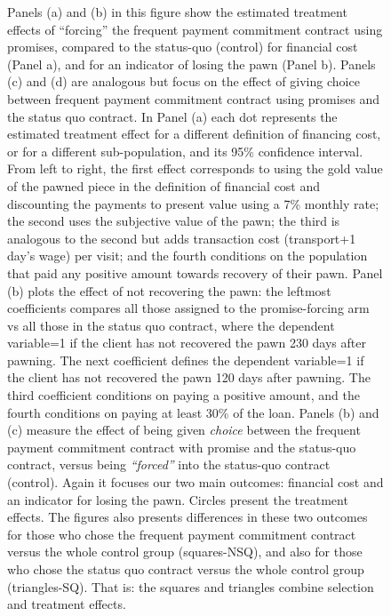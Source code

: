 \documentclass[11pt]{article}
\begin{document}
\begin{figure}[H]
\begin{center}
    \end{center}
    \scriptsize
    Panels (a) and (b) in this figure show the estimated treatment effects of ``forcing'' the frequent payment commitment contract using promises, compared to the status-quo (control) for financial cost (Panel a), and for an indicator of losing the pawn (Panel b). Panels (c) and (d) are analogous but focus on the effect of giving choice between frequent payment commitment contract using promises and the status quo contract. In Panel (a) each dot represents the estimated treatment effect for a different definition of financing cost, or for a different sub-population, and its 95\% confidence interval. From left to right, the first effect corresponds to using the gold value of the pawned piece in the definition of financial cost and discounting the payments to present value using a 7\% monthly rate; the second uses the subjective value of the pawn; the third is analogous to the second but adds transaction cost (transport+1 day's wage) per visit; and the fourth conditions on the population that paid any positive amount towards recovery of their pawn. Panel (b) plots the effect of not recovering the pawn: the leftmost coefficients compares all those assigned to the promise-forcing arm vs all those in the status quo contract, where the dependent variable=1 if the client has not recovered the pawn 230 days after pawning. The next coefficient defines the dependent variable=1 if the client has not recovered the pawn 120 days after pawning. The third coefficient conditions on paying a positive amount, and the fourth conditions on paying at least 30\% of the loan.   Panels (b) and (c) measure the effect of being given \textit{choice} between the frequent payment commitment contract with promise and the status-quo contract, versus being \textit{``forced''} into the status-quo contract (control). Again it focuses our two main outcomes: financial cost and an indicator for losing the pawn. Circles present the treatment effects. The figures also presents differences in these two outcomes for those who chose the frequent payment commitment contract versus the whole control group (squares-NSQ), and also for those who chose the status quo contract versus the whole control group (triangles-SQ). That is: the squares and triangles combine selection and treatment effects.
\end{figure}
\end{document}
